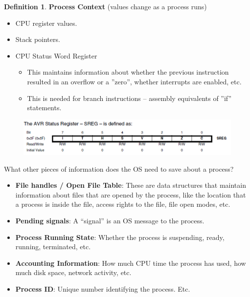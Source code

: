 \documentclass[12pt,a4paper]{article}
\theoremstyle{definition}
\newtheorem{definition}{Definition}[section]
\newenvironment{myitemize}
{ \begin{itemize}
    \setlength{\itemsep}{5pt}
    \setlength{\parskip}{0pt}
    \setlength{\parsep}{0pt}     }
{ \end{itemize}                  }
\begin{document}
\begin{definition}{\textbf{Process Context}} (values change as a process runs)
	\begin{myitemize}
		\item CPU register values. 
		\item Stack pointers.
		\item CPU Status Word Register
		\begin{myitemize}
			\item This maintains information about whether the previous instruction resulted in an overflow or a ''zero'', whether interrupts are enabled, etc.
			\item This is needed for branch instructions – assembly equivalents of ''if'' statements.
		\end{myitemize}
	\end{myitemize}
\end{definition}

\begin{figure}[h!]
	\includegraphics[scale=0.6]{m1/statusRegister}
	\centering
\end{figure}

\begin{tcolorbox}
	\textsf{What other pieces of information does the OS need to save about a process?}
	
	\begin{myitemize}
		\item \textbf{File handles / Open File Table}: These are data structures that maintain information about files that are opened by the process, like the location that a process is inside the file, access rights to the file, file open modes, etc.
		\item \textbf{Pending signals}: A “signal” is an OS message to the process.
		\item \textbf{Process Running State}: Whether the process is suspending, ready, running, terminated, etc.
		\item \textbf{Accounting Information}: How much CPU time the process has used, how much disk space, network activity, etc.
		\item \textbf{Process ID}: Unique number identifying the process. Etc.
	\end{myitemize}
\end{tcolorbox}
\end{document}
